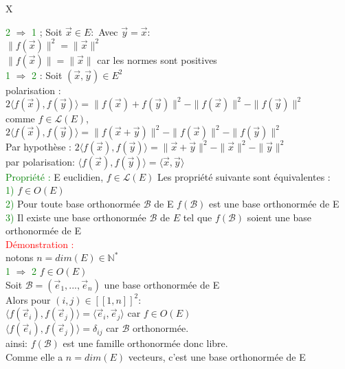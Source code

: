 X\documentclass{article}
\begin{document}
\textcolor{green}{2} $\Rightarrow$ \textcolor{green}{1} ; Soit $\vec x \in E :$ Avec $\vec y=\vec x :$ \\
$\| f(\vec x) \|^2=\|\vec x \|^2$ \\
$\| f(\vec x) \|=\| \vec x \|$ car les normes sont positives \\
\textcolor{green}{1} $\Rightarrow$ \textcolor{green}{2} : Soit $(\vec x, \vec y) \in E^2$ \\
polarisation : \\
$2 \langle f(\vec x), f(\vec y) \rangle = \| f(\vec x) + f(\vec y) \|^2- \| f(\vec x) \|^2 - \|f(\vec y) \|^2$ \\
comme $f\in \mathcal L(E)$, $2 \langle f(\vec x), f(\vec y) \rangle =\| f(\vec x + \vec y) \|^2- \| f(\vec x) \|^2 - \|f(\vec y) \|^2$ \\
Par hypothèse : $2\langle f(\vec x),f(\vec y) \rangle = \| \vec x+ \vec y \|^2- \| \vec x \|^2 - \|\vec y \|^2$ \\
par polarisation: $\langle f(\vec x),f(\vec y) \rangle = \langle \vec x, \vec y \rangle$ \\
\textcolor{green}{Propriété :} E euclidien, $f\in \mathcal L(E)$ Les propriété suivante sont équivalentes : \\
\textcolor{green}{1)} $f\in O(E)$ \\
\textcolor{green}{2)} Pour toute base orthonormée $\mathcal B$ de E $f(\mathcal B)$ est une base orthonormée de E \\
\textcolor{green}{3)} Il existe une base orthonormée $\mathcal B$ de $E$ tel que $f(\mathcal B)$ soient une base orthonormée de E \\
\textcolor{red}{Démonstration :} \\
notons $n=dim(E) \in \mathbb N^*$ \\
\textcolor{green}{1} $\Rightarrow$ \textcolor{green}{2} $f \in O(E)$ \\
Soit $\mathcal B=(\vec e_1,...,\vec e_n)$ une base orthonormée de E \\
Alors pour $(i,j) \in [[1,n]]^2 :$ \\
$\langle f(\vec e_i), f(\vec e_j) \rangle=\langle \vec e_i,\vec e_j \rangle$ car $f\in O(E)$ \\
$\langle f(\vec e_i), f(\vec e_j) \rangle=\delta_{ij}$ car $\mathcal B$ orthonormée. \\
ainsi: $f(\mathcal{B})$ est une famille orthonormée donc libre. \\
Comme elle a $n=dim(E)$ vecteurs, c'est une base orthonormée de E \\
\end{document}
